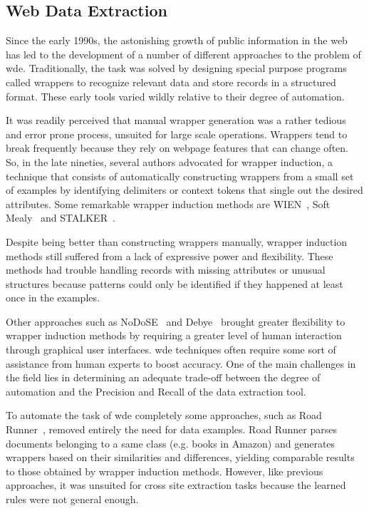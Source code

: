 \documentclass{nle}
\begin{document}
\subsection{Web Data Extraction}
\label{sec:wde}

Since the early 1990s, the astonishing growth of public information in the web has 
led to the development of a number of different approaches to the problem of \gls{wde}.
Traditionally, the task was solved by designing special purpose
programs called wrappers to recognize relevant data and store records in a structured
format. These early tools varied wildly relative to their degree of automation. 

It was readily perceived that manual wrapper generation was a rather tedious and
error prone process, unsuited for large scale operations. Wrappers tend to
break frequently because they rely on webpage features that can change 
often. So, in the late nineties, several authors advocated for wrapper induction, a technique 
that consists of automatically constructing wrappers from a small set of examples by 
identifying delimiters or context tokens that single out the desired attributes. 
Some remarkable wrapper induction methods are WIEN~\cite{Kushmerick2000}, Soft 
Mealy~\cite{Hsu1998} and STALKER~\cite{Muslea1999}.

Despite being better than constructing wrappers manually, wrapper induction methods 
still suffered from a lack of expressive power and flexibility. These methods had 
trouble handling records with missing attributes or unusual structures because
patterns could only be identified if they happened at least once in the examples.

Other approaches such as NoDoSE~\cite{Adelberg1998} and Debye~\cite{Laender2002a} 
brought greater flexibility to wrapper induction methods by requiring a greater level 
of human interaction through graphical user interfaces. \gls{wde} techniques often 
require some sort of assistance from human experts to boost accuracy. One of the main challenges 
in the field lies in determining an adequate trade-off between the degree of automation and 
the Precision and Recall of the data extraction tool.

To automate the task of \gls{wde} completely some approaches,
such as Road Runner~\cite{Crescenzi2001}, removed entirely the need for data examples.
Road Runner parses documents belonging to a same class (e.g. books in Amazon) and 
generates wrappers based on their similarities and differences, yielding comparable results 
to those obtained by wrapper induction methods. However, like previous approaches, it was 
unsuited for cross site extraction tasks because the learned rules were not general enough.
\end{document}
